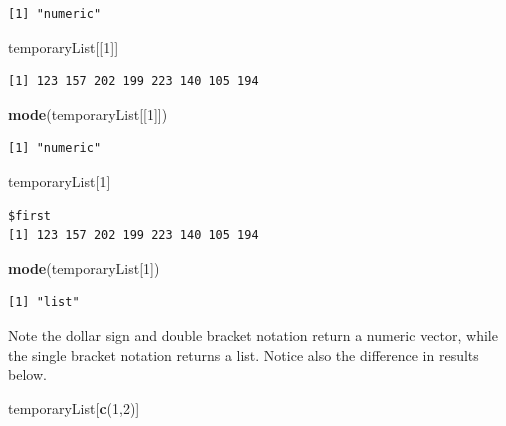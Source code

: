 \documentclass[
]{krantz}
\makeatletter
\newenvironment{Shaded}{\begin{snugshade}}{\end{snugshade}}
\newcommand{\DecValTok}[1]{\textcolor[rgb]{0.06,0.06,0.06}{#1}}
\newcommand{\KeywordTok}[1]{\textcolor[rgb]{0.27,0.27,0.27}{\textbf{#1}}}
\newcommand{\NormalTok}[1]{#1}
\newenvironment{kframe}{%
\medskip{}
\setlength{\fboxsep}{.8em}
 \def\at@end@of@kframe{}%
 \ifinner\ifhmode%
  \def\at@end@of@kframe{\end{minipage}}%
  \begin{minipage}{\columnwidth}%
 \fi\fi%
 \def\FrameCommand##1{\hskip\@totalleftmargin \hskip-\fboxsep
 \colorbox{shadecolor}{##1}\hskip-\fboxsep
     \hskip-\linewidth \hskip-\@totalleftmargin \hskip\columnwidth}%
 \MakeFramed {\advance\hsize-\width
   \@totalleftmargin\z@ \linewidth\hsize
   \@setminipage}}%
 {\par\unskip\endMakeFramed%
 \at@end@of@kframe}
\renewenvironment{Shaded}{\begin{kframe}}{\end{kframe}}
\makeatother
\begin{document}
\begin{verbatim}
[1] "numeric"
\end{verbatim}

\begin{Shaded}
\begin{Highlighting}[]
\NormalTok{temporaryList[[}\DecValTok{1}\NormalTok{]]}
\end{Highlighting}
\end{Shaded}

\begin{verbatim}
[1] 123 157 202 199 223 140 105 194
\end{verbatim}

\begin{Shaded}
\begin{Highlighting}[]
\KeywordTok{mode}\NormalTok{(temporaryList[[}\DecValTok{1}\NormalTok{]])}
\end{Highlighting}
\end{Shaded}

\begin{verbatim}
[1] "numeric"
\end{verbatim}

\begin{Shaded}
\begin{Highlighting}[]
\NormalTok{temporaryList[}\DecValTok{1}\NormalTok{]}
\end{Highlighting}
\end{Shaded}

\begin{verbatim}
$first
[1] 123 157 202 199 223 140 105 194
\end{verbatim}

\begin{Shaded}
\begin{Highlighting}[]
\KeywordTok{mode}\NormalTok{(temporaryList[}\DecValTok{1}\NormalTok{])}
\end{Highlighting}
\end{Shaded}

\begin{verbatim}
[1] "list"
\end{verbatim}

Note the dollar sign and double bracket notation return a numeric vector, while the single bracket notation returns a list. Notice also the difference in results below.

\begin{Shaded}
\begin{Highlighting}[]
\NormalTok{temporaryList[}\KeywordTok{c}\NormalTok{(}\DecValTok{1}\NormalTok{,}\DecValTok{2}\NormalTok{)]}
\end{Highlighting}
\end{Shaded}
\end{document}
